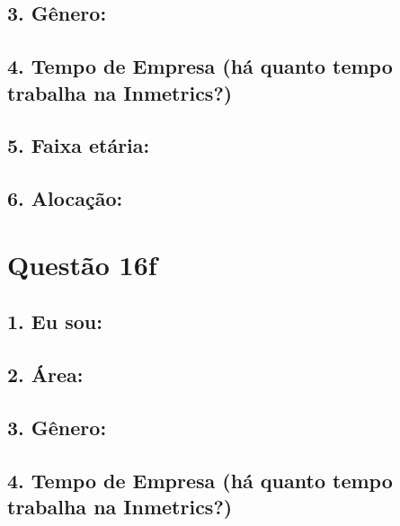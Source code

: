 \documentclass[]{book}
\begin{document}
\hypertarget{genero-33}{%
\subsection{3. Gênero:}\label{genero-33}}

\hypertarget{tempo-de-empresa-ha-quanto-tempo-trabalha-na-inmetrics-33}{%
\subsection{4. Tempo de Empresa (há quanto tempo trabalha na Inmetrics?)}\label{tempo-de-empresa-ha-quanto-tempo-trabalha-na-inmetrics-33}}

\hypertarget{faixa-etaria-33}{%
\subsection{5. Faixa etária:}\label{faixa-etaria-33}}

\hypertarget{alocacao-33}{%
\subsection{6. Alocação:}\label{alocacao-33}}

\hypertarget{questao-16f}{%
\section{Questão 16f}\label{questao-16f}}

\hypertarget{eu-sou-34}{%
\subsection{1. Eu sou:}\label{eu-sou-34}}

\hypertarget{area-34}{%
\subsection{2. Área:}\label{area-34}}

\hypertarget{genero-34}{%
\subsection{3. Gênero:}\label{genero-34}}

\hypertarget{tempo-de-empresa-ha-quanto-tempo-trabalha-na-inmetrics-34}{%
\subsection{4. Tempo de Empresa (há quanto tempo trabalha na Inmetrics?)}\label{tempo-de-empresa-ha-quanto-tempo-trabalha-na-inmetrics-34}}
\end{document}
